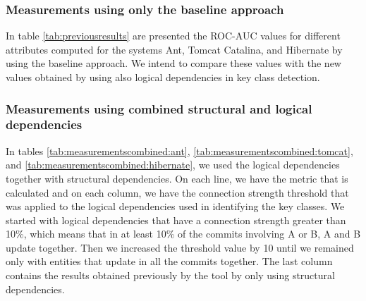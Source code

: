 \documentclass[12pt]{mitthesis}
\begin{document}
\subsubsection{Measurements using only the baseline approach}


In table \ref{tab:previousresults} are presented the ROC-AUC values for different attributes computed for the systems Ant, Tomcat Catalina, and Hibernate by using the baseline approach. We intend to compare these values with the new values obtained by using also logical dependencies in key class detection.

\begin{table}[!h]
\renewcommand{\arraystretch}{1}
\caption{ROC-AUC metric values extracted. }
\label{tab:previousresults}
\centering
{}
\end{table}





\subsubsection{Measurements using combined structural and logical dependencies}



In tables \ref{tab:measurementscombined:ant}, \ref{tab:measurementscombined:tomcat}, and \ref{tab:measurementscombined:hibernate}, we used the logical dependencies together with structural dependencies. On each line, we have the metric that is calculated and on each column, we have the connection strength threshold that was applied to the logical dependencies used in identifying the key classes.
We started with logical dependencies that have a connection strength greater than 10\%, which means that in at least 10\% of the commits involving A or B, A and B update together. Then we increased the threshold value by 10 until we remained only with entities that update in all the commits together. The last column contains the results obtained previously by the tool by only using structural dependencies.
\end{document}
